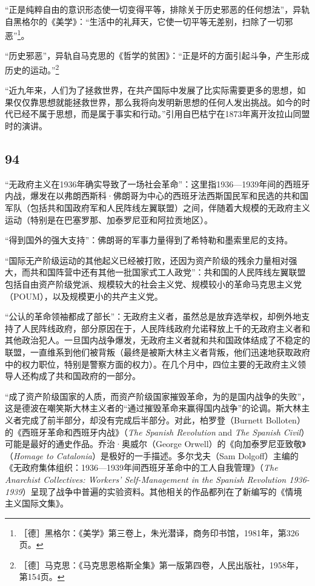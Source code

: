 \documentclass[fontset=fandol, a4paper, 12pt, openright]{ctexbook}
\begin{document}
“正是纯粹自由的意识形态使一切变得平等，排除关于历史邪恶的任何想法”，异轨自黑格尔的《美学》：“生活中的礼拜天，它使一切平等无差别，扫除了一切邪恶”\footnote{［德］黑格尔：《美学》第三卷上，朱光潜译，商务印书馆，1981年，第326页。}。

“历史邪恶”，异轨自马克思的《哲学的贫困》：“正是坏的方面引起斗争，产生形成历史的运动。”\footnote{［德］马克思：《马克思恩格斯全集》第一版第四卷，人民出版社，1958年，第154页。}

“近九年来，人们为了拯救世界，在共产国际中发展了比实际需要更多的思想，如果仅仅靠思想就能拯救世界，那么我将向发明新思想的任何人发出挑战。如今的时代已经不属于思想，而是属于事实和行动。”引用自巴枯宁在1873年离开汝拉山同盟时的演讲。

\subsection*{94}
“无政府主义在1936年确实导致了一场社会革命”：这里指1936—1939年间的西班牙内战，爆发在以弗朗西斯科·佛朗哥为中心的西班牙法西斯国民军和民选的共和国军队（包括共和国政府军和人民阵线左翼联盟）之间，伴随着大规模的无政府主义运动（特别是在巴塞罗那、加泰罗尼亚和阿拉贡地区）。

“得到国外的强大支持”：佛朗哥的军事力量得到了希特勒和墨索里尼的支持。

“国际无产阶级运动的其他起义已经被打败，还因为资产阶级的残余力量相对强大，而共和国阵营中还有其他一批国家式工人政党”：共和国的人民阵线左翼联盟包括自由资产阶级党派、规模较大的社会主义党、规模较小的革命马克思主义党（POUM），以及规模更小的共产主义党。

“公认的革命领袖都成了部长”：无政府主义者，虽然总是放弃选举权，却例外地支持了人民阵线政府，部分原因在于，人民阵线政府允诺释放上千的无政府主义者和其他政治犯人。一旦国内战争爆发，无政府主义者就和共和国政体结成了不稳定的联盟，一直维系到他们被背叛（最终是被斯大林主义者背叛，他们迅速地获取政府中的权力职位，特别是警察方面的权力）。在几个月中，四位主要的无政府主义领导人还构成了共和国政府的一部分。

“成了资产阶级国家的人质，而资产阶级国家摧毁革命，为的是国内战争的失败”，这是德波在嘲笑斯大林主义者的“通过摧毁革命来赢得国内战争”的论调。斯大林主义者完成了前半部分，却没有完成后半部分。对此，柏罗登（Burnett Bolloten）的《西班牙革命和西班牙内战》（\textit{The Spanish Revolution} and \textit{The Spanish Civil}）可能是最好的通史作品。乔治·奥威尔（George Orwell）的《向加泰罗尼亚致敬》（\textit{Homage to Catalonia}）是极好的一手描述。多尔戈夫（Sam Dolgoff）主编的《无政府集体组织：1936—1939年间西班牙革命中的工人自我管理》（\textit{The Anarchist Collectives: Workers' Self-Management in the Spanish Revolution 1936-1939}）呈现了战争中普遍的实验资料。其他相关的作品都列在了新编写的《情境主义国际文集》。
\end{document}
